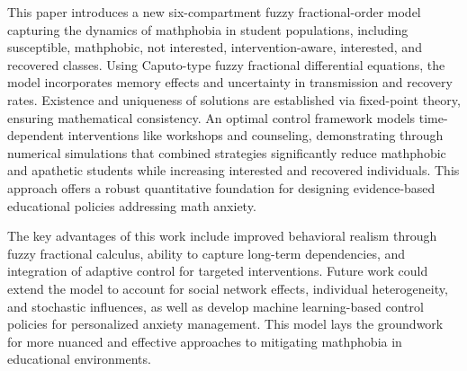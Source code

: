 \documentclass[10pt]{NSP1}
\begin{document}
This paper introduces a new six-compartment fuzzy fractional-order model capturing the dynamics of mathphobia in student populations, including susceptible, mathphobic, not interested, intervention-aware, interested, and recovered classes. Using Caputo-type fuzzy fractional differential equations, the model incorporates memory effects and uncertainty in transmission and recovery rates. Existence and uniqueness of solutions are established via fixed-point theory, ensuring mathematical consistency. An optimal control framework models time-dependent interventions like workshops and counseling, demonstrating through numerical simulations that combined strategies significantly reduce mathphobic and apathetic students while increasing interested and recovered individuals. This approach offers a robust quantitative foundation for designing evidence-based educational policies addressing math anxiety.

The key advantages of this work include improved behavioral realism through fuzzy fractional calculus, ability to capture long-term dependencies, and integration of adaptive control for targeted interventions. Future work could extend the model to account for social network effects, individual heterogeneity, and stochastic influences, as well as develop machine learning-based control policies for personalized anxiety management. This model lays the groundwork for more nuanced and effective approaches to mitigating mathphobia in educational environments.
\end{document}
